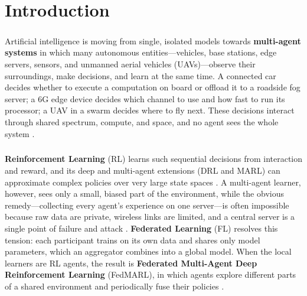 \documentclass[12pt,a4paper,final]{extreport}
\begin{document}
\setcounter{page}{1}

\chapter{Introduction}

\paragraph{} Artificial intelligence is moving from single, isolated models towards \textbf{multi-agent systems} in which many autonomous entities---vehicles, base stations, edge servers, sensors, and unmanned aerial vehicles (UAVs)---observe their surroundings, make decisions, and learn at the same time. A connected car decides whether to execute a computation on board or offload it to a roadside fog server; a 6G edge device decides which channel to use and how fast to run its processor; a UAV in a swarm decides where to fly next. These decisions interact through shared spectrum, compute, and space, and no agent sees the whole system \cite{p3}.

\paragraph{} \textbf{Reinforcement Learning} (RL) learns such sequential decisions from interaction and reward, and its deep and multi-agent extensions (DRL and MARL) can approximate complex policies over very large state spaces \cite{p1}. A multi-agent learner, however, sees only a small, biased part of the environment, while the obvious remedy---collecting every agent's experience on one server---is often impossible because raw data are private, wireless links are limited, and a central server is a single point of failure and attack \cite{p2}. \textbf{Federated Learning} (FL) resolves this tension: each participant trains on its own data and shares only model parameters, which an aggregator combines into a global model. When the local learners are RL agents, the result is \textbf{Federated Multi-Agent Deep Reinforcement Learning} (FedMARL), in which agents explore different parts of a shared environment and periodically fuse their policies \cite{p1,p3}.
\end{document}
